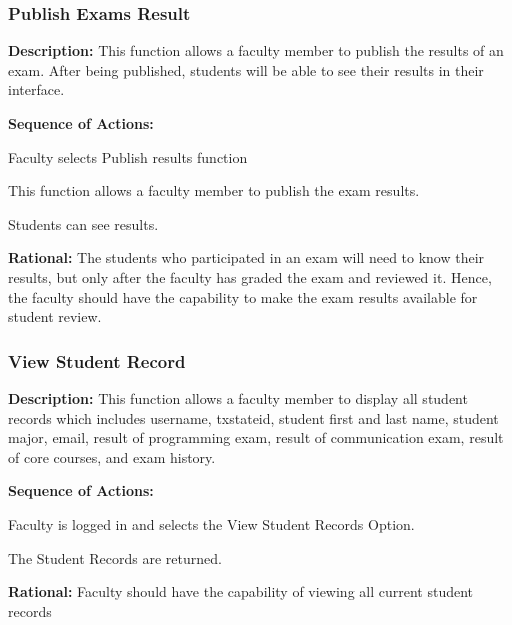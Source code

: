    \subsubsection{\large Publish Exams Result} 
   \begin{boxed} %
      \textbf{Description:}
      {\small This function allows a faculty member to publish the results of an
         exam. After being published, students will be able to see their
         results in their interface.}
         
         \textbf{Sequence of Actions:}
         \begin{enumerate}
               {\small
            \item Faculty selects Publish results function
            \item This function allows a faculty member to publish the exam results.
            \item Students can see results.}
      \end{enumerate}

         \textbf{Rational:}
         {\small The students who participated in an exam will need to know their
         results, but only after the faculty has graded the exam and reviewed
         it. Hence, the faculty should have the capability to make the exam
      results available for student review.}
   \end{boxed} %

   \subsubsection{\large View Student Record} 
   \begin{boxed} %
      \textbf{Description:}
      {\small This function allows a faculty member to display all student records
         which includes username, txstateid, student first and last name,
         student major, email, result of programming exam, result of
         communication exam, result of core courses, and exam history.}
         
         \textbf{Sequence of Actions:}
         \begin{enumerate}
               {\small
            \item Faculty is logged in and selects the View Student Records Option.
            \item The Student Records are returned.}
      \end{enumerate}

         \textbf{Rational:}
         {\small Faculty should have the capability of viewing all current student
         records}
   \end{boxed} %

